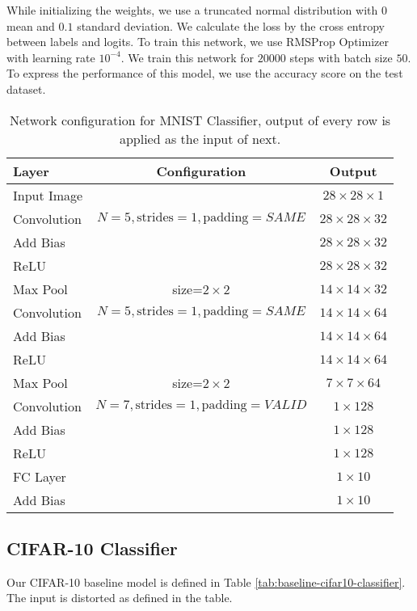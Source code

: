While initializing the weights, we use a truncated normal distribution with $0$ mean and $0.1$ standard deviation. We calculate the loss by the cross entropy between labels and logits. To train this network, we use RMSProp Optimizer with learning rate $10^{-4}$. We train this network for $20000$ steps with batch size $50$. To express the performance of this model, we use the accuracy score on the test dataset.
\begin{table}
\centering
\begin{tabular}{l | c | c}
Layer & Configuration & Output\\
\hline
Input Image & & $28 \times 28 \times 1$ \\
\hline
Convolution & \small $N=5, \text{strides}=1, \text{padding}=SAME$ & $28 \times 28 \times 32$ \\
Add Bias & & $28 \times 28 \times 32$ \\
ReLU & & $28 \times 28 \times 32$ \\
Max Pool & size=$ 2 \times 2$ & $14 \times 14 \times 32$ \\
\hline
Convolution & \small $N=5, \text{strides}=1, \text{padding}=SAME$ & $14 \times 14 \times 64$ \\
Add Bias & & $14 \times 14 \times 64$ \\
ReLU & & $14 \times 14 \times 64$ \\
Max Pool & size=$ 2 \times 2$ & $7 \times 7 \times 64$ \\
\hline
Convolution & \small $N=7, \text{strides}=1, \text{padding}=VALID$ & $1 \times 128$ \\
Add Bias & & $ 1 \times 128$ \\
ReLU & & $ 1 \times 128$ \\
\hline
FC Layer &  & $1 \times 10$ \\
Add Bias & & $1 \times 10$ 
\end{tabular}
\caption{Network configuration for MNIST Classifier, output of every row is applied as the input of next.}
\label{tab:nxn-mnist-classifier}
\end{table}

\subsection{CIFAR-10 Classifier}
Our CIFAR-10 baseline model is defined in Table \ref{tab:baseline-cifar10-classifier}. The input is distorted as defined in the table. 

